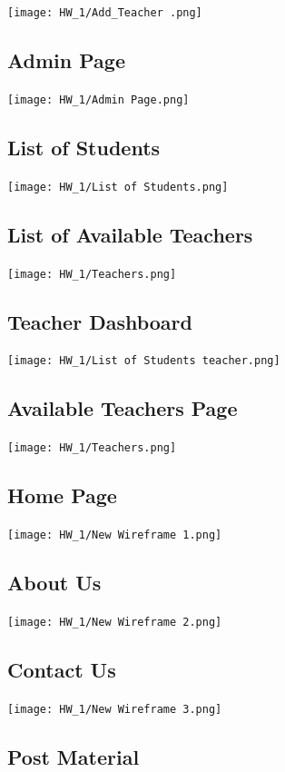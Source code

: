 \texttt{[image: HW\_1/Add\_Teacher .png]}

\subsection{Admin Page}

\texttt{[image: HW\_1/Admin Page.png]}

\subsection{List of Students}

\texttt{[image: HW\_1/List of Students.png]}

\subsection{List of Available Teachers}

\texttt{[image: HW\_1/Teachers.png]}

\subsection{Teacher Dashboard}

\texttt{[image: HW\_1/List of Students teacher.png]}

\subsection{Available Teachers Page}

\texttt{[image: HW\_1/Teachers.png]}

\subsection{Home Page}

\texttt{[image: HW\_1/New Wireframe 1.png]}

\subsection{About Us}

\texttt{[image: HW\_1/New Wireframe 2.png]}

\subsection{Contact Us}

\texttt{[image: HW\_1/New Wireframe 3.png]}

\subsection{Post Material}

